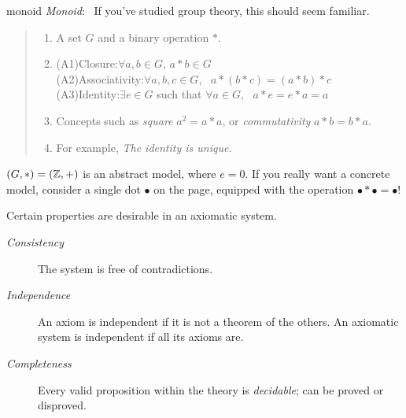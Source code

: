 \begin{example}{}{monoid}
\emph{Monoid}: \ If you've studied group theory, this should seem familiar.\vspace{-5pt}
\begin{quote}
	\begin{enumerate}%
	  \item A set $G$ and a binary operation $\ast$.
	  \item (A1)\lstsp Closure:\quad $\forall a,b\in G$, $a\ast b\in G$\\
  	\lstsp(A2)\lstsp Associativity:\quad $\forall a,b,c\in G$, \ $a\ast(b\ast c)=(a\ast b)\ast c$\\
  	\lstsp(A3)\lstsp Identity:\quad $\exists e\in G$ such that $\forall a\in G$, \ $a\ast e=e\ast a=a$
	  \item Concepts such as \emph{square} $a^2=a\ast a$, or \emph{commutativity} $a\ast b=b\ast a$.
	  \item For example, \emph{The identity is unique.}
	\end{enumerate}
\end{quote}
$(G,*)=(\mathbb{Z},+)$ is an abstract model, where $e=0$. If you really want a concrete model, consider a single dot $\bullet$ on the page, equipped with the operation $\bullet *\bullet =\bullet$!
\end{example}

\goodbreak





\begin{defn}{}{}
Certain properties are desirable in an axiomatic system.
\begin{description}
	\item[\normalfont\emph{Consistency}] The system is free of contradictions.
	\item[\normalfont\emph{Independence}] An axiom is independent if it is not a theorem of the others. An axiomatic system is independent if all its axioms are. 
	\item[\normalfont\emph{Completeness}] Every valid proposition within the theory is \emph{decidable}; can be proved or disproved.
\end{description}
\end{defn}


